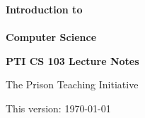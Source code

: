 \begin{titlepage}
    \vspace*{5cm}

    {\Huge \bfseries{Introduction to \\\\ Computer Science}}

    \vspace{3cm}

    {\large \textbf{PTI CS 103 Lecture Notes}}

    \vspace{1.5cm}

    {\large The Prison Teaching Initiative}

    \vfill

    {\small This version: \today}
\end{titlepage}